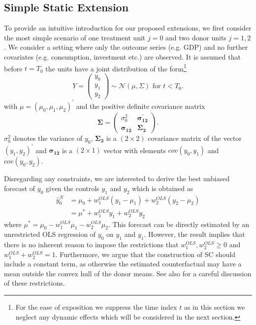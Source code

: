 \subsection{Simple Static Extension}
To provide an intuitive introduction for our proposed extensions, we first consider the most simple scenario of one treatment unit $j = 0$ and two donor units $j = 1,2$. We consider a setting where only the outcome series (e.g. \ac{GDP}) and no further covariates (e.g. consumption, investment etc.) are observed. It is assumed that before $t = T_0$ the units have a joint distribution of the form\footnote{For the ease of exposition we suppress the time index $t$ as in this section we neglect any dynamic effects which will be considered in the next section.} 
\[
Y = \begin{pmatrix} y_0\\ y_1\\ y_2 \end{pmatrix} \sim \mathcal{N}(\mu,\Sigma)
\text{ for } t<T_0.
\] 
with $\mu = \left(\mu_0, \mu_1, \mu_2  \right)^\prime$ and the positive definite covariance matrix
\[
\boldsymbol{\Sigma} = \begin{pmatrix} \sigma_0^2 & \boldsymbol{\sigma_{12}^\prime} \\
	\boldsymbol{\sigma_{12}} & \boldsymbol{\Sigma_2} \end{pmatrix}.
\] 
$\sigma_0^2$ denotes the variance of $y_0$, $\boldsymbol{\Sigma_2}$ is a $(2 \times 2)$ covariance matrix of the vector $(y_1, y_2)^\prime$ and $\boldsymbol{\sigma_{12}}$ is a $(2 \times 1)$ vector with elements $cov(y_0, y_1)$ and $cov(y_0, y_2)$.

Disregarding any constraints, we are interested to derive the best unbiased forecast of $y_0$ given the controls $y_1$ and $y_2$ which is obtained as
\begin{equation*}
	\begin{split}
		\widehat{y}^{N}_{0} & = \mu_0 + w_1^{OLS} (y_1 - \mu_1) + w_2^{OLS} (y_2 - \mu_2) \\
		& = \mu^* + w_1^{OLS} y_1 + w_2^{OLS} y_2
	\end{split}
\end{equation*}
where $\mu^* = \mu_0 - w_1^{OLS} \mu_1 - w_2^{OLS} \mu_2$. This forecast can be directly estimated by an unrestricted \ac{OLS} regression of $y_0$ on $y_1$ and $y_1$. However, the result implies that there is no inherent reason to impose the restrictions that $w_1^{OLS}, w_2^{OLS} \geq 0$ and $w_1^{OLS} + w_2^{OLS} = 1$. Furthermore, we argue that the construction of \ac{SC} should include a constant term, as otherwise the estimated counterfactual may have a mean outside the convex hull of the donor means. See also \cite{doudchenko:2016} for a careful discussion of these restrictions. 

